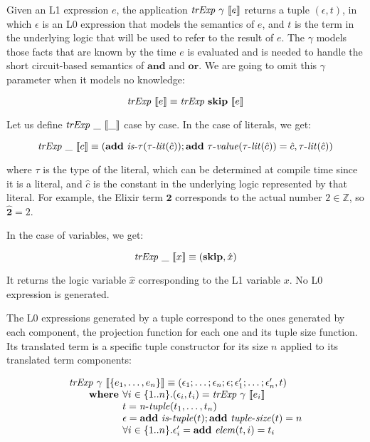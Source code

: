 Given an L1 expression $e$, the application $\mathit{trExp}~\gamma~\llbracket e\rrbracket$ returns a tuple 
$(\epsilon, t)$, in which $\epsilon$ is an L0 expression that models the
semantics of $e$, and $t$ is the term in the underlying logic that will 
be used to refer to the result of $e$. The $\gamma$ models those facts that are 
known by the time $e$ is evaluated and is needed to handle the short circuit-based 
semantics of $\mathbf{and}$ and $\mathbf{or}$. We are going to omit this $\gamma$
parameter when it models no knowledge:

\[
\mathit{trExp}~\llbracket e\rrbracket \equiv \mathit{trExp}~\textbf{skip}~\llbracket e\rrbracket
\]

Let us define $\mathit{trExp}~\_~\llbracket\_\rrbracket$ case by case. In the case of literals, we get:

\[
\mathit{trExp}~\_~\llbracket c\rrbracket \equiv (\textbf{add}~\mathit{is\mbox{-}\tau}(\mathit{\tau\mbox{-}lit}(\hat{c}));\textbf{add}~\mathit{\tau\mbox{-}value}(\mathit{\tau\mbox{-}lit}(\hat{c})) = \hat{c}, \mathit{\tau\mbox{-}lit}(\hat{c}))
\]

where $\tau$ is the type of the literal, which can be determined at compile time
since it is a literal, and $\hat{c}$ is the constant in the underlying logic represented 
by that literal. For example, the Elixir term $\mathbf{2}$ corresponds to the 
actual number $2 \in \mathbb{Z}$, so $\hat{\mathbf{2}} = 2$.

In the case of variables, we get:

\[
\mathit{trExp}~\_~\llbracket x\rrbracket \equiv (\textbf{skip}, \hat{x})
\]

It returns the logic variable $\hat{x}$ corresponding to the L1 variable $x$. 
No L0 expression is generated.

The L0 expressions generated by a tuple correspond to the ones generated by each 
component, the projection function for each one and its tuple size function. Its 
translated term is a specific tuple constructor for its size $n$ applied to its 
translated term components:

\[
\begin{array}{l}
\trExp{\gamma}{\{e_1, \ldots, e_n\}} \equiv (\epsilon_1; \dots; \epsilon_n;\epsilon;\epsilon'_1; \dots; \epsilon'_n, t)\\
\qquad \textbf{where } \forall i \in \{1..n\}. (\epsilon_i, t_i) = \trExp{\gamma}{e_i}\\
\qquad \phantom{\textbf{where }} t = \mathit{n\mbox{-}tuple}(t_1, \ldots, t_n)\\
\qquad \phantom{\textbf{where }} \epsilon = \addE~\istuple{t};\addE~\mathit{tuple\mbox{-}size}(t) = n\\
\qquad \phantom{\textbf{where }} \forall i \in \{1..n\}. \epsilon'_i = \addE~\mathit{elem}(t, i) = t_i\\
\end{array}
\]

